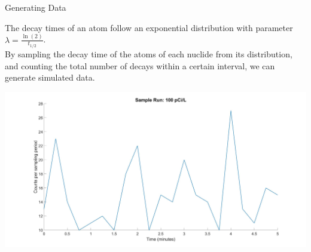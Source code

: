 \documentclass{beamer}
\begin{document}
\begin{frame}{Generating Data}
    
The decay times of an atom follow an exponential distribution with parameter $\lambda = \frac{\ln(2)}{t_{1/2}}$.\\
\vspace{0.2cm}
By sampling the decay time of the atoms of each nuclide from its distribution, and counting the total number of decays within a certain interval, we can generate simulated data. 
\begin{center}
    \includegraphics[scale=0.085]{images/samplerun.jpg}
\end{center}
\end{frame}
\end{document}
